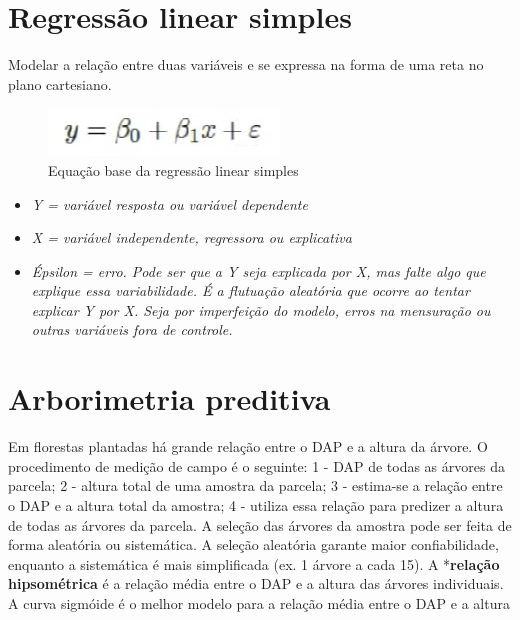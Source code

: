 \documentclass[
]{article}
\providecommand{\tightlist}{%
  \setlength{\itemsep}{0pt}\setlength{\parskip}{0pt}}
\begin{document}
\section{Regressão linear simples}\label{regressuxe3o-linear-simples}

Modelar a relação entre duas variáveis e se expressa na forma de uma
reta no plano cartesiano.

\begin{figure}

{\centering \includegraphics[width=0.8\linewidth]{IMAGES/eq-base-regressao-linear} 

}

\caption{Equação base da regressão linear simples}\label{fig:unnamed-chunk-22}
\end{figure}

\begin{itemize}
\tightlist
\item
  \emph{Y = variável resposta ou variável dependente}\\
\item
  \emph{X = variável independente, regressora ou explicativa}\\
\item
  \emph{Épsilon = erro. Pode ser que a Y seja explicada por X, mas falte
  algo que explique essa variabilidade. É a flutuação aleatória que
  ocorre ao tentar explicar Y por X. Seja por imperfeição do modelo,
  erros na mensuração ou outras variáveis fora de controle.}
\end{itemize}

\section{Arborimetria preditiva}\label{arborimetria-preditiva}

Em florestas plantadas há grande relação entre o DAP e a altura da
árvore. O procedimento de medição de campo é o seguinte: 1 - DAP de
todas as árvores da parcela; 2 - altura total de uma amostra da parcela;
3 - estima-se a relação entre o DAP e a altura total da amostra; 4 -
utiliza essa relação para predizer a altura de todas as árvores da
parcela. A seleção das árvores da amostra pode ser feita de forma
aleatória ou sistemática. A seleção aleatória garante maior
confiabilidade, enquanto a sistemática é mais simplificada (ex. 1 árvore
a cada 15). A *\textbf{relação hipsométrica} é a relação média entre o
DAP e a altura das árvores individuais. A curva sigmóide é o melhor
modelo para a relação média entre o DAP e a altura
\end{document}
